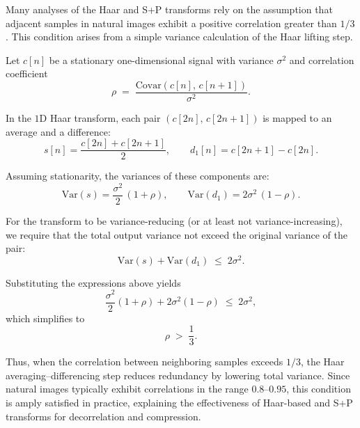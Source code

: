 
Many analyses of the Haar and S+P transforms rely on the assumption that adjacent samples in natural images exhibit a positive correlation greater than $1/3$. This condition arises from a simple variance calculation of the Haar lifting step.

Let $c[n]$ be a stationary one-dimensional signal with variance $\sigma^2$ and correlation coefficient
\[
\rho \;=\; \frac{\mathrm{Covar}(c[n],\,c[n+1])}{\sigma^2}.
\]

In the $1$D Haar transform, each pair $(c[2n],\,c[2n+1])$ is mapped to an average and a difference:
\[
s[n] = \frac{c[2n] + c[2n+1]}{2}, \qquad
d_1[n] = c[2n+1] - c[2n].
\]

Assuming stationarity, the variances of these components are:
\[
\mathrm{Var}(s) = \frac{\sigma^2}{2}\,(1 + \rho),
\qquad
\mathrm{Var}(d_1) = 2\sigma^2\,(1 - \rho).
\]

For the transform to be variance-reducing (or at least not variance-increasing), we require that the total output variance not exceed the original variance of the pair:
\[
\mathrm{Var}(s) + \mathrm{Var}(d_1) \;\le\; 2\sigma^2.
\]

Substituting the expressions above yields
\[
\frac{\sigma^2}{2}(1 + \rho) + 2\sigma^2(1 - \rho)
\;\le\;
2\sigma^2,
\]
which simplifies to
\[
\rho \;>\; \frac{1}{3}.
\]

Thus, when the correlation between neighboring samples exceeds $1/3$, the Haar averaging--differencing step reduces redundancy by lowering total variance. Since natural images typically exhibit correlations in the range $0.8$--$0.95$, this condition is amply satisfied in practice, explaining the effectiveness of Haar-based and S+P transforms for decorrelation and compression.
